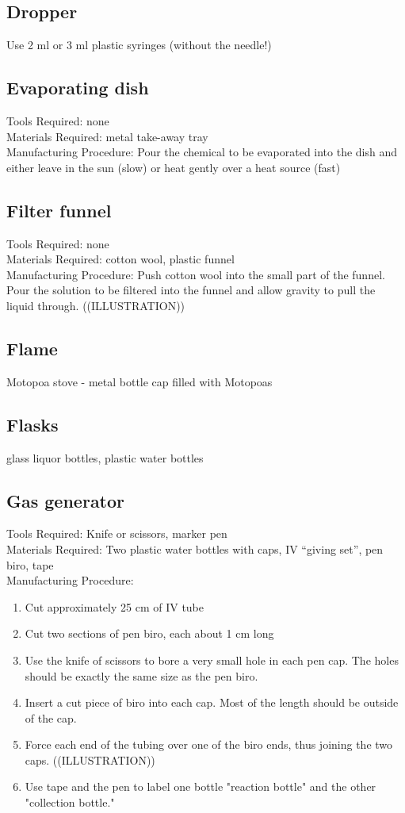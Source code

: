 \subsection*{Dropper}
Use 2 ml or 3 ml plastic syringes (without the needle!)

\subsection*{Evaporating dish}
Tools Required: none\\
Materials Required: metal take-away tray\\
Manufacturing Procedure: Pour the chemical to be evaporated into the dish and either leave in the sun (slow) or heat gently over a heat source (fast)

\subsection*{Filter funnel}
Tools Required: none\\
Materials Required: cotton wool, plastic funnel\\
Manufacturing Procedure: Push cotton wool into the small part of the funnel. Pour the solution to be filtered into the funnel and allow gravity to pull the liquid through. ((ILLUSTRATION))

\subsection*{Flame}
Motopoa stove - metal bottle cap filled with Motopoas

\subsection*{Flasks}
glass liquor bottles, plastic water bottles

\subsection*{Gas generator}
Tools Required: Knife or scissors, marker pen\\
Materials Required: Two plastic water bottles with caps, IV ``giving set'', pen biro, tape\\
Manufacturing Procedure:
\begin{enumerate}
\item{Cut approximately 25 cm of IV tube}
\item{Cut two sections of pen biro, each about 1 cm long}
\item{Use the knife of scissors to bore a very small hole in each pen cap. The holes should be exactly the same size as the pen biro.}
\item{Insert a cut piece of biro into each cap. Most of the length should be outside of the cap.}
\item{Force each end of the tubing over one of the biro ends, thus joining the two caps. ((ILLUSTRATION))}
\item{Use tape and the pen to label one bottle "reaction bottle" and the other "collection bottle."}
\end{enumerate}

